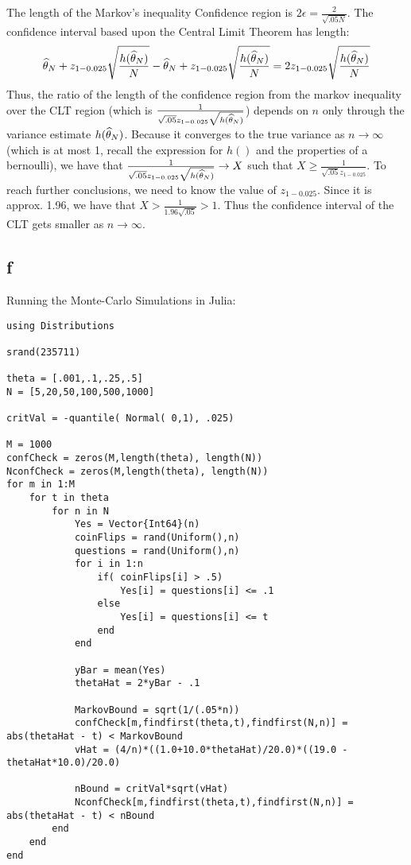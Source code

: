 \documentclass[12pt]{paper}
\begin{document}
The length of the Markov's inequality Confidence region is $2\epsilon=\frac{2}{\sqrt{.05N}}$. The
confidence interval based upon the Central Limit Theorem has length:
\begin{equation*}
\begin{split}
\widehat{ \theta }_{N} + z_{1-0.025}
\sqrt{ \frac{h( \widehat{ \theta }_{N})}{N}} - \widehat{ \theta }_{N} + z_{1-0.025}\sqrt{ \frac{h(\widehat{ \theta }_{N})}{N}}=2z_{1-0.025}
\sqrt{ \frac{h( \widehat{ \theta }_{N})}{N}}
\end{split}
\end{equation*}
Thus, the ratio of the length of the confidence region from the markov
inequality over the CLT region (which is
$\frac{1}{\sqrt{.05}z_{1-0.025}\sqrt{h(\widehat{ \theta }_{N})}}$) depends on
$n$ only through the variance estimate $h(\widehat{ \theta }_{N})$. Because it
converges to the true variance as $n\to\infty$ (which is at most 1, recall
the expression for $h()$ and the properties of a bernoulli), we have
that $\frac{1}{\sqrt{.05}z_{1-0.025}\sqrt{h(\widehat{ \theta }_{N})}}\to X$ such that
$X\ge\frac{1}{\sqrt{.05}z_{1-0.025}}$. To reach further conclusions, we
need to know the value of $z_{1-0.025}$. Since it is approx. 1.96, we
have that $X>\frac{1}{1.96\sqrt{.05}}>1$. Thus the confidence interval
of the CLT gets smaller as $n\to\infty$.

\subsection*{f}

Running the Monte-Carlo Simulations in Julia: 

\begin{verbatim}
using Distributions

srand(235711)

theta = [.001,.1,.25,.5]
N = [5,20,50,100,500,1000]

critVal = -quantile( Normal( 0,1), .025)

M = 1000
confCheck = zeros(M,length(theta), length(N))
NconfCheck = zeros(M,length(theta), length(N))
for m in 1:M
    for t in theta
        for n in N
            Yes = Vector{Int64}(n)
            coinFlips = rand(Uniform(),n)
            questions = rand(Uniform(),n)
            for i in 1:n
                if( coinFlips[i] > .5)
                    Yes[i] = questions[i] <= .1
                else
                    Yes[i] = questions[i] <= t
                end
            end

            yBar = mean(Yes)
            thetaHat = 2*yBar - .1

            MarkovBound = sqrt(1/(.05*n))
            confCheck[m,findfirst(theta,t),findfirst(N,n)] = abs(thetaHat - t) < MarkovBound
            vHat = (4/n)*((1.0+10.0*thetaHat)/20.0)*((19.0 - thetaHat*10.0)/20.0)

            nBound = critVal*sqrt(vHat)
            NconfCheck[m,findfirst(theta,t),findfirst(N,n)] = abs(thetaHat - t) < nBound
        end
    end
end
\end{verbatim}
\end{document}
